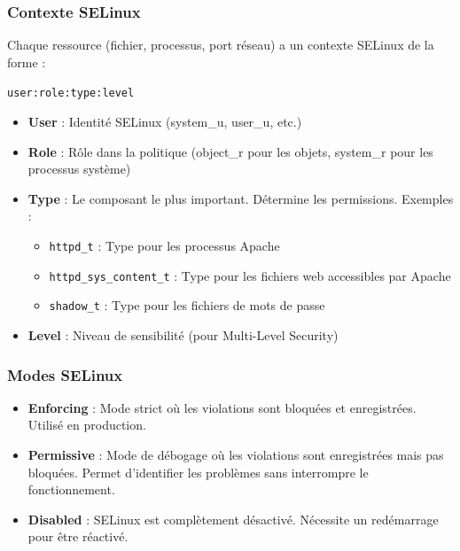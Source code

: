 \documentclass[12pt,a4paper]{article}
\begin{document}
\subsubsection{Contexte SELinux}

Chaque ressource (fichier, processus, port réseau) a un contexte SELinux de la forme :

\texttt{user:role:type:level}

\begin{itemize}
    \item \textbf{User} : Identité SELinux (system\_u, user\_u, etc.)
    
    \item \textbf{Role} : Rôle dans la politique (object\_r pour les objets, system\_r pour les processus système)
    
    \item \textbf{Type} : Le composant le plus important. Détermine les permissions. Exemples :
    \begin{itemize}
        \item \texttt{httpd\_t} : Type pour les processus Apache
        \item \texttt{httpd\_sys\_content\_t} : Type pour les fichiers web accessibles par Apache
        \item \texttt{shadow\_t} : Type pour les fichiers de mots de passe
    \end{itemize}
    
    \item \textbf{Level} : Niveau de sensibilité (pour Multi-Level Security)
\end{itemize}

\subsubsection{Modes SELinux}

\begin{itemize}
    \item \textbf{Enforcing} : Mode strict où les violations sont bloquées et enregistrées. Utilisé en production.
    
    \item \textbf{Permissive} : Mode de débogage où les violations sont enregistrées mais pas bloquées. Permet d'identifier les problèmes sans interrompre le fonctionnement.
    
    \item \textbf{Disabled} : SELinux est complètement désactivé. Nécessite un redémarrage pour être réactivé.
\end{itemize}
\end{document}
